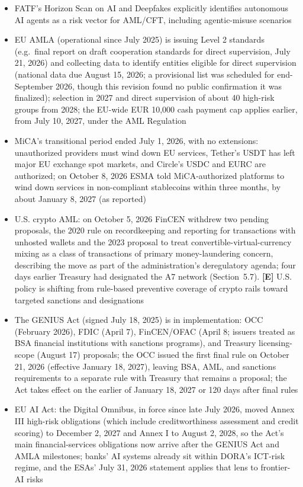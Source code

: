 \documentclass[11pt,letterpaper]{article}
\begin{document}
\begin{infobox}
\begin{itemize}
  \item FATF's Horizon Scan on AI and Deepfakes explicitly identifies autonomous AI agents as a risk vector for AML/CFT, including agentic-misuse scenarios
  \item EU AMLA (operational since July 2025) is issuing Level 2 standards (e.g.\ final report on draft cooperation standards for direct supervision, July 21, 2026) and collecting data to identify entities eligible for direct supervision (national data due August 15, 2026; a provisional list was scheduled for end-September 2026, though this revision found no public confirmation it was finalized); selection in 2027 and direct supervision of about 40 high-risk groups from 2028; the EU-wide EUR 10,000 cash payment cap applies earlier, from July 10, 2027, under the AML Regulation
  \item MiCA's transitional period ended July 1, 2026, with no extensions: unauthorized providers must wind down EU services, Tether's USDT has left major EU exchange spot markets, and Circle's USDC and EURC are authorized; on October 8, 2026 ESMA told MiCA-authorized platforms to wind down services in non-compliant stablecoins within three months, by about January 8, 2027 (as reported)
  \item U.S. crypto AML: on October 5, 2026 FinCEN withdrew two pending proposals, the 2020 rule on recordkeeping and reporting for transactions with unhosted wallets and the 2023 proposal to treat convertible-virtual-currency mixing as a class of transactions of primary money-laundering concern, describing the move as part of the administration's deregulatory agenda; four days earlier Treasury had designated the A7 network (Section~5.7). \textbf{[E]} U.S. policy is shifting from rule-based preventive coverage of crypto rails toward targeted sanctions and designations
  \item The GENIUS Act (signed July 18, 2025) is in implementation: OCC (February 2026), FDIC (April 7), FinCEN/OFAC (April 8; issuers treated as BSA financial institutions with sanctions programs), and Treasury licensing-scope (August 17) proposals; the OCC issued the first final rule on October 21, 2026 (effective January 18, 2027), leaving BSA, AML, and sanctions requirements to a separate rule with Treasury that remains a proposal; the Act takes effect on the earlier of January 18, 2027 or 120 days after final rules
  \item EU AI Act: the Digital Omnibus, in force since late July 2026, moved Annex III high-risk obligations (which include creditworthiness assessment and credit scoring) to December 2, 2027 and Annex I to August 2, 2028, so the Act's main financial-services obligations now arrive after the GENIUS Act and AMLA milestones; banks' AI systems already sit within DORA's ICT-risk regime, and the ESAs' July 31, 2026 statement applies that lens to frontier-AI risks

\end{itemize}
\end{infobox}
\end{document}
